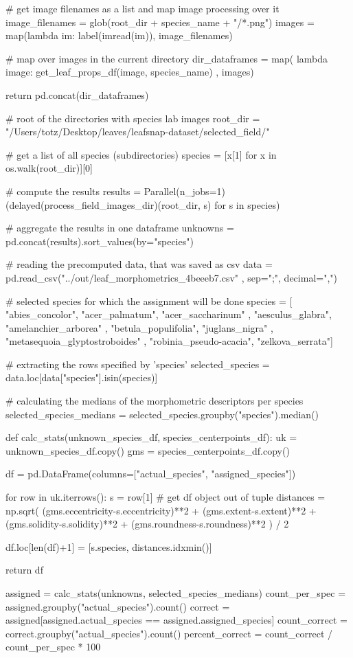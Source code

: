     # get image filenames as a list and map image processing over it
    image_filenames = glob(root_dir + species_name + "/*.png")
    images = map(lambda im: label(imread(im)), image_filenames)

    # map over images in the current directory
    dir_dataframes = map( lambda image: get_leaf_props_df(image, species_name)
                        , images)

    return pd.concat(dir_dataframes)


# root of the directories with species lab images
root_dir = "/Users/totz/Desktop/leaves/leafsnap-dataset/selected_field/"

# get a list of all species (subdirectories)
species = [x[1] for x in os.walk(root_dir)][0]

# compute the results
results = Parallel(n_jobs=1)
            (delayed(process_field_images_dir)(root_dir, s) for s in species)


# aggregate the results in one dataframe
unknowns = pd.concat(results).sort_values(by="species")


# reading the precomputed data, that was saved as csv
data = pd.read_csv("../out/leaf_morphometrics_4beeeb7.csv"
                  , sep=";", decimal=",")

# selected species for which the assignment will be done
species = [ "abies_concolor", "acer_palmatum", "acer_saccharinum"
          , "aesculus_glabra", "amelanchier_arborea"
          , "betula_populifolia", "juglans_nigra"
          , "metasequoia_glyptostroboides"
          , "robinia_pseudo-acacia", "zelkova_serrata"]

# extracting the rows specified by 'species'
selected_species = data.loc[data["species"].isin(species)]

# calculating the medians of the morphometric descriptors per species
selected_species_medians = selected_species.groupby("species").median()


def calc_stats(unknown_species_df, species_centerpoints_df):
    uk = unknown_species_df.copy()
    gms = species_centerpoints_df.copy()
    
    df = pd.DataFrame(columns=["actual_species", "assigned_species"])
    
    for row in uk.iterrows():
        s = row[1] # get df object out of tuple
        distances = np.sqrt( (gms.eccentricity-s.eccentricity)**2 
                                + (gms.extent-s.extent)**2 
                                + (gms.solidity-s.solidity)**2
                                + (gms.roundness-s.roundness)**2 ) / 2

        df.loc[len(df)+1] = [s.species, distances.idxmin()]

    return df

assigned       = calc_stats(unknowns, selected_species_medians)
count_per_spec = assigned.groupby("actual_species").count()
correct        = assigned[assigned.actual_species == assigned.assigned_species]
count_correct  = correct.groupby("actual_species").count()
percent_correct = count_correct / count_per_spec * 100
\stopPYTHON




